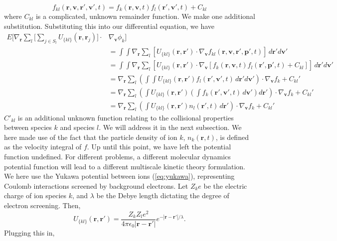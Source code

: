 \documentclass{article}
\begin{document}
\begin{equation}f_{kl}(\mathbf{r},\mathbf{v},\mathbf{r}',\mathbf{v}',t)=f_k(\mathbf{r},\mathbf{v},t)f_l(\mathbf{r}',\mathbf{v}',t)+C_{kl}\label{f2}
\end{equation}where $C_{kl}$ is a complicated, unknown remainder function. We make one additional substitution. Substituting this into our differential equation, we have
\begin{align*}
E\bigg[\nabla_\mathbf{r}\sum_l\bigg[\sum_{j\in S_l}U_{\{kl\}}(\mathbf{r},\mathbf{r}_j)\bigg]\cdot&\nabla_\mathbf{v}\phi_k\bigg]\\&=\int\int\nabla_\mathbf{r}\sum_l\left[U_{\{kl\}}(\mathbf{r},\mathbf{r}')\cdot\nabla_\mathbf{v}f_{kl}(\mathbf{r},\mathbf{v},\mathbf{r}',\mathbf{p}',t)\right]\,d\mathbf{r}'d\mathbf{v}'\\
&=\int\int\nabla_\mathbf{r}\sum_l\left[ U_{\{kl\}}(\mathbf{r},\mathbf{r}')\cdot\nabla_\mathbf{v}\left[f_{k}(\mathbf{r},\mathbf{v},t)f_l(\mathbf{r}',\mathbf{p}',t)+C_{kl}\right]\right]\,d\mathbf{r}'d\mathbf{v}'
\\
&=\nabla_\mathbf{r}\sum_l\left(\int\int U_{\{kl\}}(\mathbf{r},\mathbf{r}')f_l(\mathbf{r}',\mathbf{v}',t)\,d\mathbf{r}'d\mathbf{v}'\right)\cdot\nabla_\mathbf{v}f_k+C_{kl}'\\
&=\nabla_\mathbf{r}\sum_l\left(\int U_{\{kl\}}(\mathbf{r},\mathbf{r}')\left(\int f_k(\mathbf{r}',\mathbf{v}',t)\,d\mathbf{v}'\right)d\mathbf{r}'\right)\cdot\nabla_\mathbf{v} f_k+C_{kl}'\\
&=\nabla_\mathbf{r}\sum_l\left(\int U_{\{kl\}}(\mathbf{r},\mathbf{r}') n_l(\mathbf{r}',t)\,d\mathbf{r}'\right)\cdot\nabla_\mathbf{v} f_k+C_{kl}'
\end{align*}$C'_{kl}$ is an additional unknown function relating to the collisional properties between species $k$ and species $l$. We will address it in the next subsection. We here made use of the fact that the particle density of ion $k$, $n_k(\mathbf{r},t)$, is defined as the velocity integral of $f$. Up until this point, we have left the potential function undefined. For different problems, a different molecular dynamics potential function will lead to a different multiscale kinetic theory formulation. We here use the Yukawa potential between ions (\ref{eq:yukawa}), representing Coulomb interactions screened by background electrons. Let $Z_ke$ be the electric charge of ion species $k$, and $\lambda$ be the Debye length dictating the degree of electron screening. Then,
\[U_{\{kl\}}(\mathbf{r},\mathbf{r}')=\frac{Z_kZ_l e^2}{4\pi \epsilon_0|\mathbf{r}-\mathbf{r}'|}e^{-|\mathbf{r}-\mathbf{r}'|/\lambda}.
\]Plugging this in,
\end{document}
